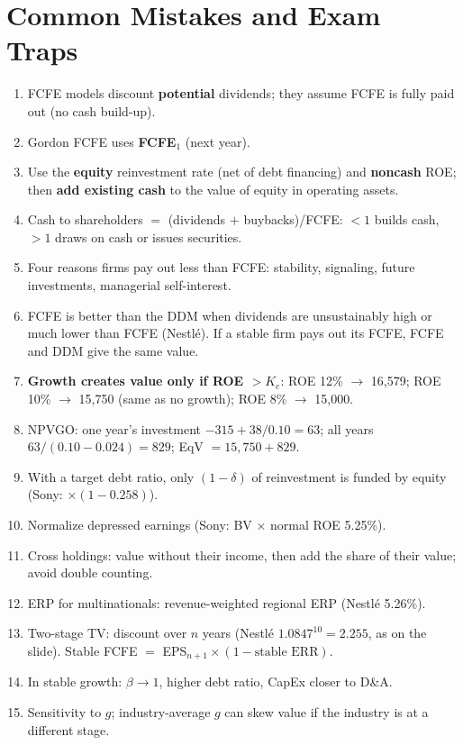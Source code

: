\section{Common Mistakes and Exam Traps}
\begin{trapbox}
\begin{enumerate}[leftmargin=*]
  \item FCFE models discount \textbf{potential} dividends; they assume FCFE is fully paid out (no cash build-up).
  \item Gordon FCFE uses \textbf{FCFE$_1$} (next year).
  \item Use the \textbf{equity} reinvestment rate (net of debt financing) and \textbf{noncash} ROE; then \textbf{add existing cash} to the value of equity in operating assets.
  \item Cash to shareholders $=$ (dividends $+$ buybacks)/FCFE: $<1$ builds cash, $>1$ draws on cash or issues securities.
  \item Four reasons firms pay out less than FCFE: stability, signaling, future investments, managerial self-interest.
  \item FCFE is better than the DDM when dividends are unsustainably high or much lower than FCFE (Nestl\'e). If a stable firm pays out its FCFE, FCFE and DDM give the same value.
  \item \textbf{Growth creates value only if ROE $>K_e$}: ROE 12\% $\to$ 16,579; ROE 10\% $\to$ 15,750 (same as no growth); ROE 8\% $\to$ 15,000.
  \item NPVGO: one year's investment $-315+38/0.10=63$; all years $63/(0.10-0.024)=829$; EqV $=15{,}750+829$.
  \item With a target debt ratio, only $(1-\delta)$ of reinvestment is funded by equity (Sony: $\times(1-0.258)$).
  \item Normalize depressed earnings (Sony: BV $\times$ normal ROE 5.25\%).
  \item Cross holdings: value without their income, then add the share of their value; avoid double counting.
  \item ERP for multinationals: revenue-weighted regional ERP (Nestl\'e 5.26\%).
  \item Two-stage TV: discount over $n$ years (Nestl\'e $1.0847^{10}=2.255$, as on the slide). Stable FCFE $=$ EPS$_{n+1}\times(1-\text{stable ERR})$.
  \item In stable growth: $\beta\to1$, higher debt ratio, CapEx closer to D\&A.
  \item Sensitivity to $g$; industry-average $g$ can skew value if the industry is at a different stage.
\end{enumerate}
\end{trapbox}
